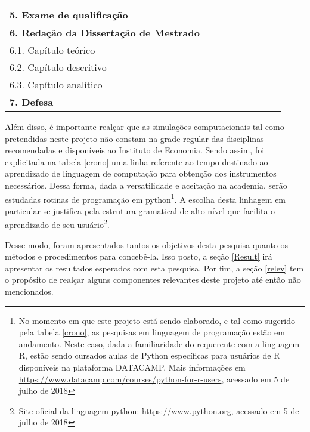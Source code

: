 \begin{table}[H]
{\begin{tabular}{ll|l|l|l|l|l|l|l}
			\textbf{5. Exame de qualificação} &  &  &  &  &  &  & \cellcolor[HTML]{5076B0} &  \\ \hline
			\textbf{6. Redação da Dissertação de Mestrado} &  \multicolumn{8}{c}{}  \\ \hline
			6.1. Capítulo teórico &  &  &  & \cellcolor[HTML]{5076B0} & &  &  &  \\ \hline
			6.2. Capítulo descritivo &  &  &  &  & \cellcolor[HTML]{5076B0} & \cellcolor[HTML]{5076B0} &  &  \\ \hline
			6.3. Capítulo analítico &  &  &  &  & & \cellcolor[HTML]{5076B0} & \cellcolor[HTML]{5076B0} &  \\ \hline
			\textbf{7. Defesa} &  &  &  &  &  &  &  & \cellcolor[HTML]{5076B0} \\ \hline \hline
		\end{tabular}%
	}
\end{table}


Além disso, é importante realçar que as simulações computacionais tal como pretendidas neste projeto não constam na grade regular das disciplinas recomendadas e disponíveis ao Instituto de Economia. Sendo assim, foi explicitada na tabela \ref{crono} uma linha referente ao tempo destinado ao aprendizado de linguagem de computação para obtenção dos instrumentos necessários. Dessa forma, dada a versatilidade e aceitação na academia, serão estudadas rotinas de programação em python\footnote{No momento em que este projeto está sendo elaborado, e tal como sugerido pela tabela \ref{crono}, as pesquisas em linguagem de programação estão em andamento. Neste caso, dada a familiaridade do requerente com a linguagem R, estão sendo cursados aulas de Python específicas para usuários de R disponíveis na plataforma DATACAMP. Mais informações em \url{https://www.datacamp.com/courses/python-for-r-users}, acessado em 5 de julho de 2018}. A escolha desta linhagem em particular se justifica pela estrutura gramatical de alto nível que facilita o aprendizado de seu usuário\footnote{Site oficial da linguagem python: \url{https://www.python.org}, acessado em 5 de julho de 2018}.

Desse modo, foram apresentados tantos os objetivos desta pesquisa quanto os métodos e procedimentos para concebê-la. Isso posto, a seção \ref{Result} irá apresentar os resultados esperados com esta pesquisa.
Por fim, a seção \ref{relev} tem o propósito de realçar alguns componentes relevantes deste projeto até então não mencionados.

